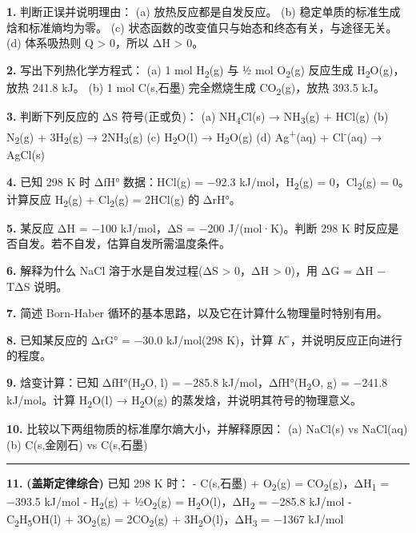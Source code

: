 \textbf{1.} 判断正误并说明理由：
(a) 放热反应都是自发反应。
(b) 稳定单质的标准生成焓和标准熵均为零。
(c) 状态函数的改变值只与始态和终态有关，与途径无关。
(d) 体系吸热则 Q \textgreater{} 0，所以 ΔH \textgreater{} 0。

\textbf{2.} 写出下列热化学方程式：
(a) 1 mol H\textsubscript{2}(g) 与 ½ mol O\textsubscript{2}(g) 反应生成 H\textsubscript{2}O(g)，放热 241.8 kJ。
(b) 1 mol C(s,石墨) 完全燃烧生成 CO\textsubscript{2}(g)，放热 393.5 kJ。

\textbf{3.} 判断下列反应的 ΔS 符号(正或负)：
(a) NH\textsubscript{4}Cl(s) → NH\textsubscript{3}(g) + HCl(g)
(b) N\textsubscript{2}(g) + 3H\textsubscript{2}(g) → 2NH\textsubscript{3}(g)
(c) H\textsubscript{2}O(l) → H\textsubscript{2}O(g)
(d) Ag\textsuperscript{+}(aq) + Cl\textsuperscript{-}(aq) → AgCl(s)

\textbf{4.} 已知 298 K 时 ΔfH° 数据：HCl(g) = −92.3 kJ/mol，H\textsubscript{2}(g) = 0，Cl\textsubscript{2}(g) = 0。计算反应 H\textsubscript{2}(g) + Cl\textsubscript{2}(g) = 2HCl(g) 的 ΔrH°。

\textbf{5.} 某反应 ΔH = −100 kJ/mol，ΔS = −200 J/(mol·K)。判断 298 K 时反应是否自发。若不自发，估算自发所需温度条件。

\textbf{6.} 解释为什么 NaCl 溶于水是自发过程(ΔS \textgreater{} 0，ΔH \textgreater{} 0)，用 ΔG = ΔH − TΔS 说明。

\textbf{7.} 简述 Born-Haber 循环的基本思路，以及它在计算什么物理量时特别有用。

\textbf{8.} 已知某反应的 ΔrG° = −30.0 kJ/mol(298 K)，计算 \(K^{\circ}\)，并说明反应正向进行的程度。

\textbf{9.} 焓变计算：已知 ΔfH°(H\textsubscript{2}O, l) = −285.8 kJ/mol，ΔfH°(H\textsubscript{2}O, g) = −241.8 kJ/mol。计算 H\textsubscript{2}O(l) → H\textsubscript{2}O(g) 的蒸发焓，并说明其符号的物理意义。

\textbf{10.} 比较以下两组物质的标准摩尔熵大小，并解释原因：
(a) NaCl(s) vs NaCl(aq)
(b) C(s,金刚石) vs C(s,石墨)

\begin{center}\rule{0.5\linewidth}{0.5pt}\end{center}

\textbf{11.} \textbf{(盖斯定律综合)} 已知 298 K 时：
- C(s,石墨) + O\textsubscript{2}(g) = CO\textsubscript{2}(g)，ΔH\textsubscript{1} = −393.5 kJ/mol
- H\textsubscript{2}(g) + ½O\textsubscript{2}(g) = H\textsubscript{2}O(l)，ΔH\textsubscript{2} = −285.8 kJ/mol
- C\textsubscript{2}H\textsubscript{5}OH(l) + 3O\textsubscript{2}(g) = 2CO\textsubscript{2}(g) + 3H\textsubscript{2}O(l)，ΔH\textsubscript{3} = −1367 kJ/mol

